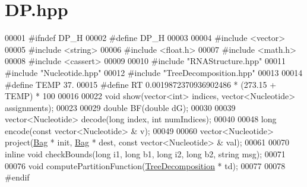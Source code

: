 \hypertarget{_d_p_8hpp_source}{}\section{D\+P.\+hpp}
\label{_d_p_8hpp_source}

\begin{DoxyCode}
00001 \textcolor{preprocessor}{#ifndef DP\_H}
00002 \textcolor{preprocessor}{#define DP\_H}
00003 
00004 \textcolor{preprocessor}{#include <vector>}
00005 \textcolor{preprocessor}{#include <string>}
00006 \textcolor{preprocessor}{#include <float.h>}
00007 \textcolor{preprocessor}{#include <math.h>}
00008 \textcolor{preprocessor}{#include <cassert>}
00009 
00010 \textcolor{preprocessor}{#include "RNAStructure.hpp"}
00011 \textcolor{preprocessor}{#include "Nucleotide.hpp"}
00012 \textcolor{preprocessor}{#include "TreeDecomposition.hpp"}
00013 
00014 \textcolor{preprocessor}{#define TEMP 37.}
00015 \textcolor{preprocessor}{#define RT 0.0019872370936902486 * (273.15 + TEMP) * 100}
00016 
00022 \textcolor{keywordtype}{void} show(vector<int> indices, vector<Nucleotide> assignments);
00023 
00029 \textcolor{keywordtype}{double} BF(\textcolor{keywordtype}{double} dG);
00030 
00039 vector<Nucleotide> decode(\textcolor{keywordtype}{long} index, \textcolor{keywordtype}{int} numIndices);
00040 
00048 \textcolor{keywordtype}{long} encode(\textcolor{keyword}{const} vector<Nucleotide> & v);
00049 
00060 vector<Nucleotide> project(\hyperlink{class_bag}{Bag} * init, \hyperlink{class_bag}{Bag} * dest, \textcolor{keyword}{const} vector<Nucleotide> & val);
00061 
00070 \textcolor{keyword}{inline} \textcolor{keywordtype}{void} checkBounds(\textcolor{keywordtype}{long} i1, \textcolor{keywordtype}{long} b1, \textcolor{keywordtype}{long} i2, \textcolor{keywordtype}{long} b2, \textcolor{keywordtype}{string} msg);
00071 
00076 \textcolor{keywordtype}{void} computePartitionFunction(\hyperlink{class_tree_decomposition}{TreeDecomposition} * td);
00077 
00078 \textcolor{preprocessor}{#endif}
\end{DoxyCode}
